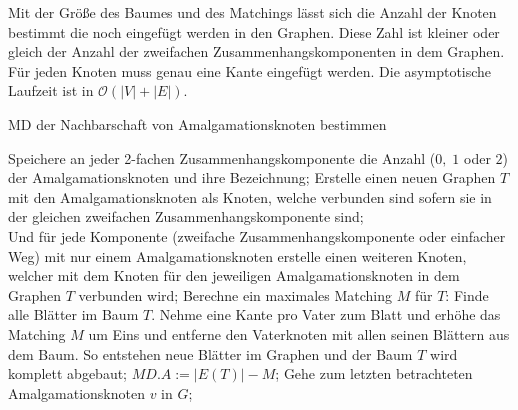 Mit der Größe des Baumes und des Matchings lässt sich die Anzahl der Knoten bestimmt die noch eingefügt werden in den Graphen. Diese Zahl ist kleiner oder gleich der Anzahl der zweifachen Zusammenhangskomponenten in dem Graphen. Für jeden Knoten muss genau eine Kante eingefügt werden. Die asymptotische Laufzeit ist in $\mathcal{O}(|V|+|E|)$.
\begin{algorithm}
\caption{MD der Nachbarschaft von Amalgamationsknoten bestimmen}
\begin{algorithmic}[1]
\vspace{2mm}
\ENDFOR
\STATE Speichere an jeder 2-fachen Zusammenhangskomponente die Anzahl ($0,\;1$ oder $2$) der Amalgamationsknoten und ihre Bezeichnung; 
\STATE Erstelle einen neuen Graphen $T$ mit den Amalgamationsknoten als Knoten, welche verbunden sind sofern sie in der gleichen zweifachen Zusammenhangskomponente sind;\\
\STATE Und für jede Komponente (zweifache Zusammenhangskomponente oder einfacher Weg) mit nur einem Amalgamationsknoten erstelle einen weiteren Knoten, welcher mit dem Knoten für den jeweiligen Amalgamationsknoten in dem Graphen $T$ verbunden wird;
\STATE Berechne ein maximales Matching $M$ für $T$: Finde alle Blätter im Baum $T$. Nehme eine Kante pro Vater zum Blatt und erhöhe das Matching $M$ um Eins und entferne den Vaterknoten mit allen seinen Blättern aus dem Baum. So entstehen neue Blätter im Graphen und der Baum $T$ wird komplett abgebaut;
\STATE $MD.A:=|E(T)|-M$;
\STATE Gehe zum letzten betrachteten Amalgamationsknoten $v$ in $G$;
\ENDIF
{}
\ENDFOR
\end{algorithmic}
\label{algsonderfall2}
\end{algorithm}
\clearpage
